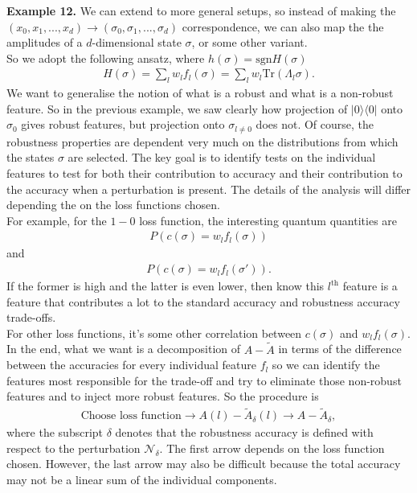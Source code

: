 \documentclass[onecolumn,prx, superscriptaddress,longbibliography,margin=1mm 11pt]{revtex4-2}
\begin{document}
     
\noindent \textbf{Example 12.}
     We can extend to more general setups, so instead of making the $(x_0,x_1,...,x_d) \rightarrow (\sigma_0, \sigma_1,...,\sigma_d)$ correspondence, we can also map the the amplitudes of a $d$-dimensional state $\sigma$, or some other variant. \\
     
     So we adopt the following ansatz, where $h(\sigma)=\text{sgn}H(\sigma)$
     \begin{align}
         H(\sigma)=\sum_{l}w_l f_l(\sigma)=\sum_l w_l \text{Tr}(\Lambda_l \sigma).
     \end{align}
     We want to generalise the notion of what is a robust and what is a non-robust feature. So in the previous example, we saw clearly how projection of $|0\rangle \langle 0|$ onto $\sigma_0$ gives robust features, but projection onto $\sigma_{l \neq 0}$ does not. Of course, the robustness properties are dependent very much on the distributions from which the states $\sigma$ are selected. The key goal is to identify tests on the individual features to test for both their contribution to accuracy and their contribution to the accuracy when a perturbation is present. The details of the analysis will differ depending the on the loss functions chosen.\\
     
     For example, for the $1-0$ loss function, the interesting quantum quantities are 
     \begin{align}
         P(c(\sigma)=w_l f_l(\sigma))
     \end{align}
     and
     \begin{align}
         P(c(\sigma)=w_l f_l(\sigma')).
     \end{align}
     If the former is high and the latter is even lower, then know this $l^{\text{th}}$ feature is a feature that contributes a lot to the standard accuracy and robustness accuracy trade-offs. \\
     
     For other loss functions, it's some other correlation between $c(\sigma)$ and $w_l f_l(\sigma)$. \\
     
     In the end, what we want is a decomposition of $A-\tilde{A}$ in terms of the difference between the accuracies for every individual feature $f_l$ so we can identify the features most responsible for the trade-off and try to eliminate those non-robust features and to inject more robust features. So the procedure is
     \begin{align}
         \text{Choose loss function} \rightarrow A(l)-\tilde{A}_{\delta}(l) \rightarrow A-\tilde{A}_{\delta},
     \end{align}
     where the subscript $\delta$ denotes that the robustness accuracy is defined with respect to the perturbation $\mathcal{N}_{\delta}$. 
     The first arrow depends on the loss function chosen. However, the last arrow may also be difficult because the total accuracy may not be a linear sum of the individual components.\\
     
\end{document}
